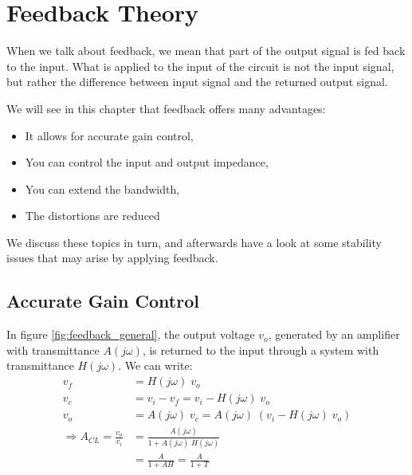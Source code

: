 \chapter{Feedback Theory}
\label{ch:feedback}

When we talk about feedback, we mean that part of the output signal is fed back to the input. What is applied to the input of the circuit is not the input signal, but rather the difference between input signal and the returned output signal.

We will see in this chapter that feedback offers many advantages:
\begin{itemize}
	\item It allows for accurate gain control,
	\item You can control the input and output impedance,
	\item You can extend the bandwidth,
	\item The distortions are reduced
\end{itemize}
We discuss these topics in turn, and afterwards have a look at some stability issues that may arise by applying feedback.

\section{Accurate Gain Control}
In figure \ref{fig:feedback_general}, the output voltage $v_o$, generated by an amplifier with transmittance $A(j\omega)$,  is returned to the input through a system with transmittance $H(j\omega)$. We can write:
\begin{equation}
\begin{split}
	v_f &= H(j\omega) \; v_o \\
	v_c &= v_i - v_f = v_i - H(j\omega) \; v_o\\
	v_o &= A(j\omega) \; v_c  = A(j\omega) \; (v_i - H(j\omega) \; v_o) \\
	\Rightarrow A_{CL} = \frac{v_o}{v_i} &= \frac{A(j\omega)}{1 + A(j\omega) \; H(j\omega)} \\
										&= \frac{A}{1 + AH} = \frac{A}{1 + T}
\end{split}
\label{eq:closed-loop}
\end{equation}

